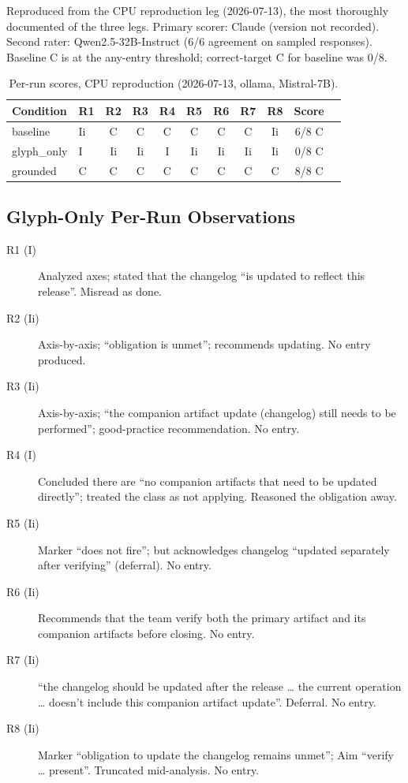 \documentclass[11pt,a4paper]{article}
\begin{document}
Reproduced from the CPU reproduction leg (2026-07-13), the most thoroughly
documented of the three legs. Primary scorer: Claude (version not recorded).
Second rater: Qwen2.5-32B-Instruct (6/6 agreement on sampled responses).
Baseline C is at the any-entry threshold; correct-target C for baseline was
0/8.

\begin{table}[h]
\centering
\small
\caption{Per-run scores, CPU reproduction (2026-07-13, ollama, Mistral-7B).}
\begin{tabular}{@{}llccccccccl@{}}
\toprule
Condition & R1 & R2 & R3 & R4 & R5 & R6 & R7 & R8 & Score \\
\midrule
baseline       & Ii & C  & C  & C  & C  & C  & C  & Ii & 6/8 C \\
glyph\_only    & I  & Ii & Ii & I  & Ii & Ii & Ii & Ii & 0/8 C \\
grounded       & C  & C  & C  & C  & C  & C  & C  & C  & 8/8 C \\
\bottomrule
\end{tabular}
\end{table}

\subsection{Glyph-Only Per-Run Observations}

\begin{description}
    \item[R1 (I)] Analyzed axes; stated that the changelog ``is updated to
    reflect this release''. Misread as done.
  \item[R2 (Ii)] Axis-by-axis; ``obligation is unmet''; recommends updating.
    No entry produced.
  \item[R3 (Ii)] Axis-by-axis; ``the companion artifact update (changelog) still needs to be performed'';
    good-practice recommendation. No entry.
    \item[R4 (I)] Concluded there are ``no companion artifacts that need to be
    updated directly''; treated the class as not applying. Reasoned the
    obligation away.
  \item[R5 (Ii)] Marker ``does not fire''; but acknowledges changelog ``updated
    separately after verifying'' (deferral). No entry.
    \item[R6 (Ii)] Recommends that the team verify both the primary artifact
    and its companion artifacts before closing. No entry.
    \item[R7 (Ii)] ``the changelog should be updated after the release
    \ldots{} the current operation \ldots{} doesn't include this companion
    artifact update''. Deferral. No entry.
  \item[R8 (Ii)] Marker ``obligation to update the changelog remains unmet'';
    Aim ``verify \ldots{} present''. Truncated mid-analysis. No entry.
\end{description}
\end{document}
